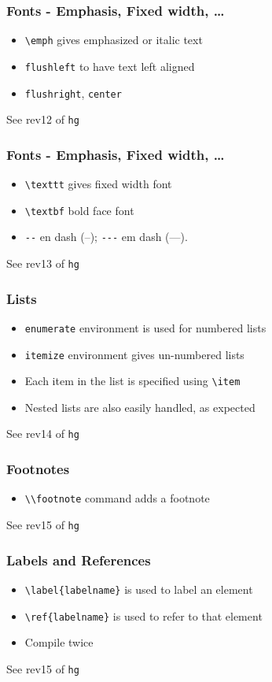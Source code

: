 \documentclass{beamer}
\newcommand{\typ}[1]{\lstinline{#1}}
\begin{document}
\begin{frame}[fragile]
  \frametitle{Fonts - Emphasis, Fixed width, \ldots}
  \begin{itemize}
  \item \lstinline{\emph} gives emphasized or italic text
  \item \typ{flushleft} to have text left aligned
  \item \typ{flushright}, \typ{center}
  \end{itemize}
  \tiny See rev12 of \typ{hg}
\end{frame}

\begin{frame}[fragile]
  \frametitle{Fonts - Emphasis, Fixed width, \ldots}
  \begin{itemize}
  \item \lstinline{\texttt} gives fixed width font
  \item \lstinline{\textbf} bold face font
  \item \lstinline{--} en dash (--); \lstinline{---} em dash (---). 
  \end{itemize}
  \tiny See rev13 of \typ{hg}
\end{frame}

\begin{frame}[fragile]
  \frametitle{Lists}
  \begin{itemize}
  \item \lstinline{enumerate} environment is used for numbered lists
  \item \lstinline{itemize} environment gives un-numbered lists
  \item Each item in the list is specified using \lstinline{\item}
  \item Nested lists are also easily handled, as expected
  \end{itemize}
  \tiny See rev14 of \typ{hg}
\end{frame}

\begin{frame}[fragile]
  \frametitle{Footnotes}
  \begin{itemize}
  \item \typ{\\footnote} command adds a footnote
  \end{itemize}
  \tiny See rev15 of \typ{hg}
\end{frame}

\begin{frame}[fragile]
  \frametitle{Labels and References}
  \begin{itemize}
  \item \lstinline+\label{labelname}+ is used to label an element
  \item \lstinline+\ref{labelname}+ is used to refer to that element
  \item Compile twice
  \end{itemize}
  \tiny See rev15 of \typ{hg}
\end{frame}
\end{document}
